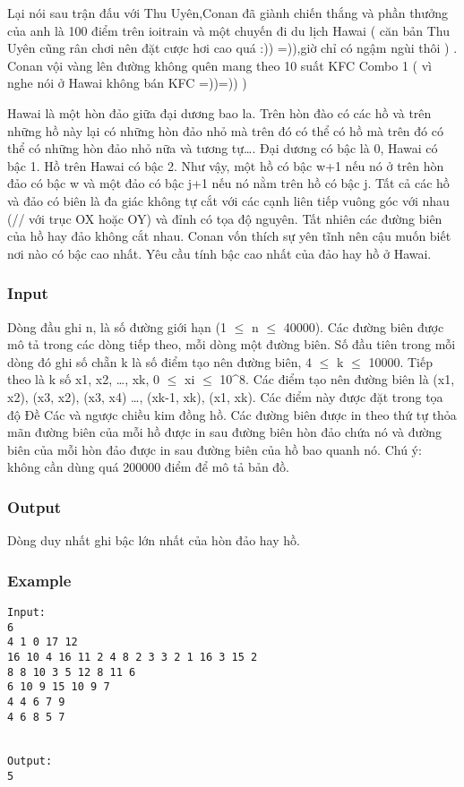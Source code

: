 



   Lại nói sau trận đấu với Thu Uyên,Conan đã giành chiến thắng và phần thưởng của anh là 100 điểm trên ioitrain và một chuyến đi du lịch Hawai ( căn bản Thu Uyên cũng rân chơi nên đặt cược hơi cao quá :)) =)),giờ chỉ có ngậm ngùi thôi ) . Conan vội vàng lên đường không quên mang theo 10 suất KFC Combo 1 ( vì nghe nói ở Hawai không bán KFC =))=)) )  

   Hawai là một hòn đảo giữa đại dương bao la. Trên hòn đào có các hồ và trên những hồ này lại có những hòn đảo nhỏ mà trên đó có thể có hồ mà trên đó có thể có những hòn đảo nhỏ nữa và tương tự…. Đại dương có bậc là 0, Hawai có bậc 1. Hồ trên Hawai có bậc 2. Như vậy, một hồ có bậc w+1 nếu nó ở trên hòn đảo có bậc w và một đảo có bậc j+1 nếu nó nằm trên hồ có bậc j. Tất cả các hồ và đảo có biên là đa giác không tự cắt với các cạnh liên tiếp vuông góc với nhau (// với trục OX hoặc OY) và đỉnh có tọa độ nguyên. Tất nhiên các đường biên của hồ hay đảo không cắt nhau. Conan vốn thích sự yên tĩnh nên cậu muốn biết nơi nào có bậc cao nhất. Yêu cầu tính bậc cao nhất của đảo hay hồ ở Hawai.  

\subsubsection{   Input  }  Dòng đầu ghi n, là số đường giới hạn (1  $\le$  n  $\le$  40000).  Các đường biên được mô tả trong các dòng tiếp theo, mỗi dòng một đường biên. Số đầu tiên trong mỗi dòng đó ghi số chẵn k là số điểm tạo nên đường biên, 4  $\le$  k  $\le$  10000. Tiếp theo là k số x1, x2, …, xk, 0  $\le$  xi  $\le$  10^8. Các điểm tạo nên đường biên là (x1, x2), (x3, x2), (x3, x4) …, (xk-1, xk), (x1, xk). Các điểm này được đặt trong tọa độ Đề Các và ngược chiều kim đồng hồ. Các đường biên được in theo thứ tự thỏa mãn đường biên của mỗi hồ được in sau đường biên hòn đảo chứa nó và đường biên của mỗi hòn đảo được in sau đường biên của hồ bao quanh nó. Chú ý: không cần dùng quá 200000 điểm để mô tả bản đồ.  

\subsubsection{   Output  }  Dòng duy nhất ghi bậc lớn nhất của hòn đảo hay hồ.  

\subsubsection{   Example  }
\begin{verbatim}
Input:
6
4 1 0 17 12
16 10 4 16 11 2 4 8 2 3 3 2 1 16 3 15 2
8 8 10 3 5 12 8 11 6
6 10 9 15 10 9 7
4 4 6 7 9
4 6 8 5 7


Output:
5
\end{verbatim}
